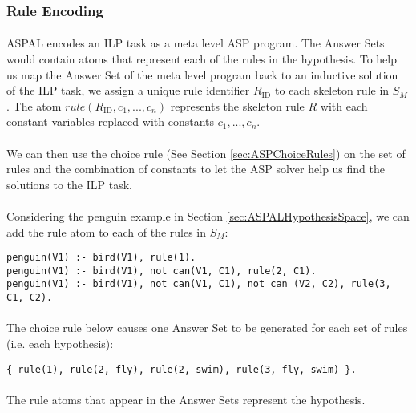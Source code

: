 \documentclass{article}
\theoremstyle{plain}
\theoremstyle{definition}
\begin{document}
\begin{multicols}{2}
\subsubsection{Rule Encoding}

\paragraph{} ASPAL encodes an ILP task as a meta level ASP program. The Answer Sets would contain atoms that represent each of the rules in the hypothesis. To help us map the Answer Set of the meta level program back to an inductive solution of the ILP task, we assign a unique rule identifier $R_\text{ID}$ to each skeleton rule in $S_M$. The atom $rule(R_\text{ID}, c_1, ..., c_n)$ represents the skeleton rule $R$ with each constant variables replaced with constants $c_1, ..., c_n$.

\paragraph{} We can then use the choice rule (See Section \ref{sec:ASPChoiceRules}) on the set of rules and the combination of constants to let the ASP solver help us find the solutions to the ILP task.

\paragraph{} Considering the penguin example in Section \ref{sec:ASPALHypothesisSpace}, we can add the rule atom to each of the rules in $S_M$:

\begin{lstlisting}
penguin(V1) :- bird(V1), rule(1).
penguin(V1) :- bird(V1), not can(V1, C1), rule(2, C1).
penguin(V1) :- bird(V1), not can(V1, C1), not can (V2, C2), rule(3, C1, C2).
\end{lstlisting}

\paragraph{} The choice rule below causes one Answer Set to be generated for each set of rules (i.e. each hypothesis):

\begin{lstlisting}
{ rule(1), rule(2, fly), rule(2, swim), rule(3, fly, swim) }.
\end{lstlisting}

\paragraph{} The rule atoms that appear in the Answer Sets represent the hypothesis. 


\end{multicols}
\end{document}
